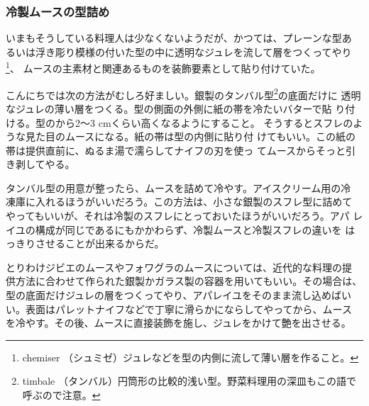 \begin{recette}
\hypertarget{moulage-des-mousses-froides}{%
\subsubsection{冷製ムースの型詰め}\label{moulage-des-mousses-froides}}



いまもそうしている料理人は少なくないようだが、かつては、プレーンな型あ
るいは浮き彫り模様の付いた型の中に透明なジュレを流して層をつくってやり\footnote{chemiser
  （シュミゼ）ジュレなどを型の内側に流して薄い層を作ること。}、
ムースの主素材と関連あるものを装飾要素として貼り付けていた。

こんにちでは次の方法がむしろ好ましい。銀製のタンバル型\footnote{timbale
  （タンバル）円筒形の比較的浅い型。野菜料理用の深皿もこの語で呼ぶので注意。}の底面だけに
透明なジュレの薄い層をつくる。型の側面の外側に紙の帯を冷たいバターで貼
り付ける。型のから2〜3 cmくらい高くなるようにすること。
そうするとスフレのような見た目のムースになる。紙の帯は型の内側に貼り付
けてもいい。この紙の帯は提供直前に、ぬるま湯で濡らしてナイフの刃を使っ
てムースからそっと引き剥してやる。

タンバル型の用意が整ったら、ムースを詰めて冷やす。アイスクリーム用の冷
凍庫に入れるほうがいいだろう。この方法は、小さな銀製のスフレ型に詰めて
やってもいいが、それは冷製のスフレにとっておいたほうがいいだろう。アパ
レイユの構成が同じであるにもかかわらず、冷製ムースと冷製スフレの違いを
はっきりさせることが出来るからだ。

とりわけジビエのムースやフォワグラのムースについては、近代的な料理の提
供方法に合わせて作られた銀製かガラス製の容器を用いてもいい。その場合は、
型の底面だけジュレの層をつくってやり、アパレイユをそのまま流し込めばい
い。表面はパレットナイフなどで丁寧に滑らかにならしてやってから、ムース
を冷やす。その後、ムースに直接装飾を施し、ジュレをかけて艶を出させる。


\end{recette}
